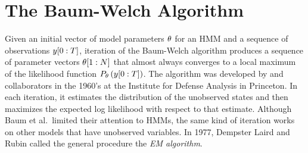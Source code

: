 \section{The Baum-Welch Algorithm}
\label{sec:baum_welch}

Given an initial vector of model parameters $\theta$ for an HMM
and a sequence of observations $y[0:T]$, iteration of the
Baum-Welch algorithm  produces a
sequence of parameter vectors $\theta[1:N]$ that almost
always converges to a local maximum of the likelihood function
$P_{\theta} \left( y[0:T] \right)$.  The algorithm was
developed by  and collaborators \cite{Baum70,Baum67} in
the 1960's at the Institute for Defense Analysis in Princeton.  In
each iteration, it estimates the distribution of the unobserved states
and then maximizes the expected log likelihood with respect to that
estimate.  Although Baum et al.\ limited their attention to HMMs, the
same kind of iteration works on other models that have unobserved
variables.  In 1977, Dempster Laird and Rubin \cite{Dempster77} called
the general procedure the \emph{EM algorithm}.  %
%

